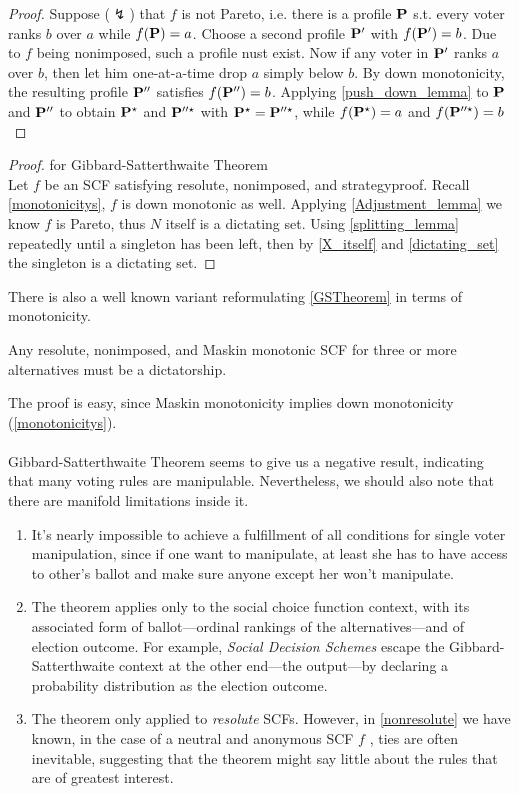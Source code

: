 \begin{proof}
    Suppose ($\lightning$) that $f$ is not Pareto, i.e. there is a profile $\mathbf{P}$ s.t. every voter ranks $b$ over $a$ while $f(\mathbf{P}) = a$. Choose a second profile $\mathbf{P}'$ with $f(\mathbf{P}') = b$. Due to $f$ being nonimposed, such a profile nust exist. Now if any voter in $\mathbf{P}'$ ranks $a$ over $b$, then let him one-at-a-time drop $a$ simply below $b$. By down monotonicity, the resulting profile $\mathbf{P}''$ satisfies $f(\mathbf{P}'') = b$. Applying \cref{push_down_lemma} to $\mathbf{P}$ and $\mathbf{P}''$ to obtain $\mathbf{P}^\star$ and $\mathbf{P}''^\star$ with $\mathbf{P}^\star = \mathbf{P}''^\star$, while $f(\mathbf{P}^\star) = a$ and $f(\mathbf{P}''^\star) = b$
\end{proof}

\begin{proof}
    for Gibbard-Satterthwaite Theorem\\
    Let $f$ be an SCF satisfying resolute, nonimposed, and strategyproof. Recall \cref{monotonicitys}, $f$ is down monotonic as well. Applying \cref{Adjustment_lemma} we know $f$ is Pareto, thus $N$ itself is a dictating set. Using \cref{splitting_lemma} repeatedly until a singleton has been left, then by \cref{X_itself} and \cref{dictating_set} the singleton is a dictating set.
\end{proof}

There is also a well known variant reformulating \cref{GSTheorem} in terms of monotonicity.

\begin{theorem}
    Any resolute, nonimposed, and Maskin monotonic SCF for three or more alternatives must be a dictatorship.
\end{theorem}

The proof is easy, since Maskin monotonicity implies down monotonicity (\cref{monotonicitys}).\\
~\\
Gibbard-Satterthwaite Theorem seems to give us a negative result, indicating that many voting rules are manipulable. Nevertheless, we should also note that there are manifold limitations inside it.

\begin{enumerate}
    \item It's nearly impossible to achieve a fulfillment of all conditions for single voter manipulation, since if one want to manipulate, at least she has to have access to other's ballot and make sure anyone except her won't manipulate.
    \item The theorem applies only to the social choice function context, with its associated form of ballot---ordinal rankings of the alternatives---and of election outcome. For example, \textit{Social Decision Schemes} escape the Gibbard-Satterthwaite context at the other end---the output---by declaring a probability distribution as the election outcome.
    \item The theorem only applied to \emph{resolute} SCFs. However, in \cref{nonresolute} we have known, in the case of a neutral and anonymous SCF $f$ , ties are often inevitable, suggesting that the theorem might say little about the rules that are of greatest interest.
\end{enumerate}

